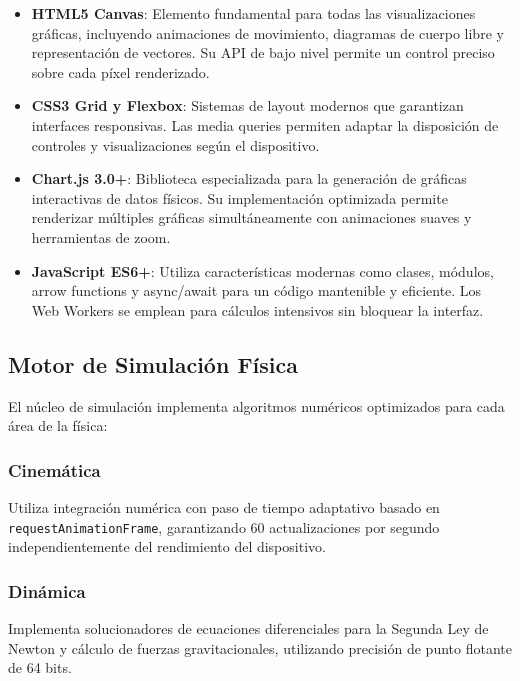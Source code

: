 \begin{itemize}
    \item \textbf{HTML5 Canvas}: Elemento fundamental para todas las visualizaciones gráficas, incluyendo animaciones de movimiento, diagramas de cuerpo libre y representación de vectores. Su API de bajo nivel permite un control preciso sobre cada píxel renderizado.
    
    \item \textbf{CSS3 Grid y Flexbox}: Sistemas de layout modernos que garantizan interfaces responsivas. Las media queries permiten adaptar la disposición de controles y visualizaciones según el dispositivo.
    
    \item \textbf{Chart.js 3.0+}: Biblioteca especializada para la generación de gráficas interactivas de datos físicos. Su implementación optimizada permite renderizar múltiples gráficas simultáneamente con animaciones suaves y herramientas de zoom.
    
    \item \textbf{JavaScript ES6+}: Utiliza características modernas como clases, módulos, arrow functions y async/await para un código mantenible y eficiente. Los Web Workers se emplean para cálculos intensivos sin bloquear la interfaz.
\end{itemize}

\subsection{Motor de Simulación Física}

El núcleo de simulación implementa algoritmos numéricos optimizados para cada área de la física:

\subsubsection{Cinemática}
Utiliza integración numérica con paso de tiempo adaptativo basado en \texttt{requestAnimationFrame}, garantizando 60 actualizaciones por segundo independientemente del rendimiento del dispositivo.

\subsubsection{Dinámica}
Implementa solucionadores de ecuaciones diferenciales para la Segunda Ley de Newton y cálculo de fuerzas gravitacionales, utilizando precisión de punto flotante de 64 bits.

